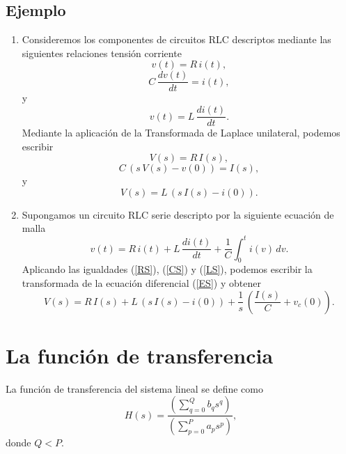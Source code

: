 \subsection{Ejemplo}

\begin{enumerate}
\item Consideremos los componentes de circuitos RLC descriptos
  mediante las siguientes relaciones tensi\'{o}n corriente
\begin{equation}
  v(t) = R \, i(t),
\end{equation}
\begin{equation}
  C \, \frac{dv(t)}{dt} = i(t),
\end{equation}
y
\begin{equation}
  v(t) = L \, \frac{d i(t)}{dt}.
\end{equation}
Mediante la aplicaci\'{o}n de la Transformada de Laplace unilateral,
podemos escribir
\begin{equation}
  V(s) = R \, I(s), \label{RS}
\end{equation}
\begin{equation}
  C \, \left( s \, V(s) - v(0) \right) = I(s), \label{CS}
\end{equation}
y
\begin{equation}
  V(s) = L \, \left(s \, I(s) - i(0)\right). \label{LS}
\end{equation}

\item Supongamos un circuito RLC serie descripto por la siguiente
  ecuaci\'{o}n de malla
\begin{equation}
  v(t) = R \, i(t) + L \, \frac{di(t)}{dt} + 
    \frac{1}{C} \int_{0}^{t} i(v) \, dv. \label{ES}
\end{equation}
Aplicando las igualdades (\ref{RS}), (\ref{CS}) y (\ref{LS}), podemos
escribir la transformada de la ecuaci\'{o}n diferencial (\ref{ES}) y
obtener
\begin{equation}
  V(s) = R \, I(s) + L \, \left(s \, I(s) - i(0)\right) + \frac{1}{s}
  \, \left(\frac{I(s)}{C} + v_{c}(0)\right).
\end{equation}

\end{enumerate}

\section{La funci\'{o}n de transferencia}

La funci\'{o}n de transferencia del sistema lineal se define como
 \begin{equation}
   H\left( s\right) =
     \frac{\left( \sum_{q=0}^{Q}b_{q}s^{q}\right) }{\left(\sum_{p=0}^{P}a_{p}s^{p}\right) },
 \end{equation}
donde $Q < P$.

